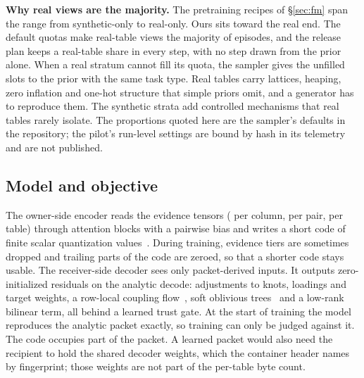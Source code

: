 \documentclass[10pt,letterpaper,twocolumn]{article}
\newcommand{\runin}[1]{\par\smallskip\noindent\textbf{#1.}\hspace{0.45em}\ignorespaces}
\begin{document}
\runin{Why real views are the majority} The pretraining recipes of \S\ref{sec:fm} span the range from synthetic-only to real-only. Ours sits toward the real end. The default quotas make real-table views the majority of episodes, and the release plan keeps a real-table share in every step, with no step drawn from the prior alone. When a real stratum cannot fill its quota, the sampler gives the unfilled slots to the prior with the same task type. Real tables carry lattices, heaping, zero inflation and one-hot structure that simple priors omit, and a generator has to reproduce them. The synthetic strata add controlled mechanisms that real tables rarely isolate. The proportions quoted here are the sampler's defaults in the repository; the pilot's run-level settings are bound by hash in its telemetry and are not published.

\subsection{Model and objective}
The owner-side encoder reads the evidence tensors ( per column,  per pair,  per table) through attention blocks with a pairwise bias and writes a short code of finite scalar quantization values~\cite{mentzer2024fsq}. During training, evidence tiers are sometimes dropped and trailing parts of the code are zeroed, so that a shorter code stays usable. The receiver-side decoder sees only packet-derived inputs. It outputs zero-initialized residuals on the analytic decode: adjustments to knots, loadings and target weights, a row-local coupling flow~\cite{dinh2017realnvp}, soft oblivious trees~\cite{popov2020node} and a low-rank bilinear term, all behind a learned trust gate. At the start of training the model reproduces the analytic packet exactly, so training can only be judged against it. The code occupies part of the packet. A learned packet would also need the recipient to hold the shared decoder weights, which the container header names by fingerprint; those weights are not part of the per-table byte count.
\end{document}
